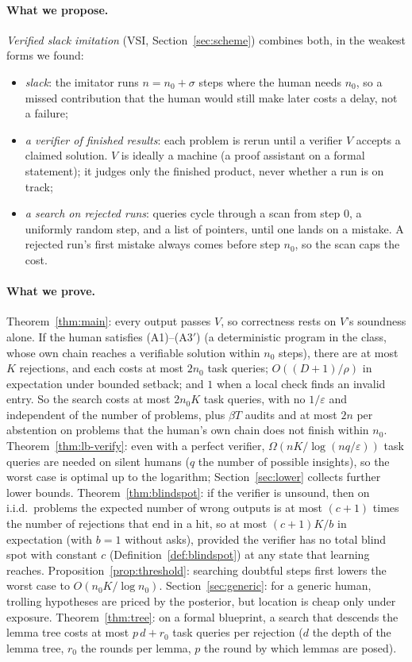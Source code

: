 \documentclass[11pt]{article}
\theoremstyle{definition}
\theoremstyle{remark}
\newcommand{\K}{K}
\begin{document}
\paragraph{What we propose.} \emph{Verified slack imitation} (VSI, Section~\ref{sec:scheme}) combines both, in the weakest forms we found:
\begin{itemize}[nosep]
\item \emph{slack}: the imitator runs $n = n_0 + \sigma$ steps where the human needs $n_0$, so a missed contribution that the human would still make later costs a delay, not a failure;
\item \emph{a verifier of finished results}: each problem is rerun until a verifier $V$ accepts a claimed solution. $V$ is ideally a machine (a proof assistant on a formal statement); it judges only the finished product, never whether a run is on track;
\item \emph{a search on rejected runs}: queries cycle through a scan from step 0, a uniformly random step, and a list of pointers, until one lands on a mistake. A rejected run's first mistake always comes before step $n_0$, so the scan caps the cost.
\end{itemize}

\paragraph{What we prove.} Theorem~\ref{thm:main}: every output passes $V$, so correctness rests on $V$'s soundness alone. If the human satisfies (A1)--(A3$'$) (a deterministic program in the class, whose own chain reaches a verifiable solution within $n_0$ steps), there are at most $\K$ rejections, and each costs at most $2n_0$ task queries; $O((D{+}1)/\rho)$ in expectation under bounded setback; and $1$ when a local check finds an invalid entry. So the search costs at most $2n_0\K$ task queries, with no $1/\varepsilon$ and independent of the number of problems, plus $\beta T$ audits and at most $2n$ per abstention on problems that the human's own chain does not finish within $n_0$. Theorem~\ref{thm:lb-verify}: even with a perfect verifier, $\Omega(n\K/\log(nq/\varepsilon))$ task queries are needed on silent humans ($q$ the number of possible insights), so the worst case is optimal up to the logarithm; Section~\ref{sec:lower} collects further lower bounds. Theorem~\ref{thm:blindspot}: if the verifier is unsound, then on i.i.d.\ problems the expected number of wrong outputs is at most $(c+1)$ times the number of rejections that end in a hit, so at most $(c+1)\K/b$ in expectation (with $b=1$ without asks), provided the verifier has no total blind spot with constant $c$ (Definition~\ref{def:blindspot}) at any state that learning reaches. Proposition~\ref{prop:threshold}: searching doubtful steps first lowers the worst case to $O(n_0\K/\log n_0)$. Section~\ref{sec:generic}: for a generic human, trolling hypotheses are priced by the posterior, but location is cheap only under exposure. Theorem~\ref{thm:tree}: on a formal blueprint, a search that descends the lemma tree costs at most $p\,d+r_0$ task queries per rejection ($d$ the depth of the lemma tree, $r_0$ the rounds per lemma, $p$ the round by which lemmas are posed).
\end{document}
